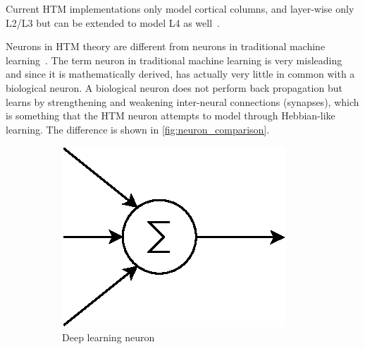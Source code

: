 Current HTM implementations only model cortical columns, and layer-wise only L2/L3 but can be extended to model L4 as well~\cite{htm_l2_l3}.
\par
Neurons in HTM theory are different from neurons in traditional machine learning~\cite{htm_neurons}. The term neuron in traditional machine learning is very misleading and since it is mathematically derived, has actually very little in common with a biological neuron. A biological neuron does not perform back propagation but learns by strengthening and weakening inter-neural connections (synapses), which is something that the HTM neuron attempts to model through Hebbian-like learning. The difference is shown in \autoref{fig:neuron_comparison}.
\begin{figure}[H]
    \centering
    \begin{subfigure}[b]{0.35\linewidth}
        \includegraphics[width=\linewidth]{resources/related_works/neuron_ml}
        \caption{Deep learning neuron}
    \end{subfigure}\\
    \begin{subfigure}[b]{0.35\linewidth}
        \centering
        \hspace*{1cm}

\end{subfigure}
\end{figure}
